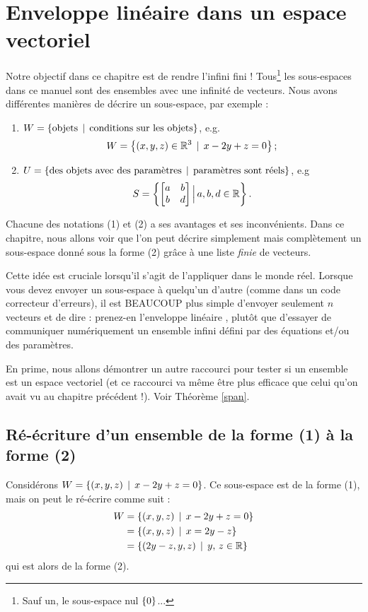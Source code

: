\chapter{Enveloppe linéaire dans un espace vectoriel} \label{chapter:Fr_06-span}


Notre objectif dans ce chapitre est de rendre l'infini fini !  Tous\footnote{Sauf un, le sous-espace nul $\{0\}$...} les sous-espaces dans ce manuel sont des ensembles avec une infinité de vecteurs.  Nous avons différentes manières de décrire un sous-espace, par exemple :
\begin{enumerate}
	\item[(1)] $W = \{ \textrm{objets} \, \mid \, \textrm{conditions sur les objets} \}$,
e.g. $$W = \big\{ (x,y,z) \in \mathbb{R}^3\, \mid \, x -2y+ z=0\big\}\,;$$
	\item[(2)] $U = \{ \textrm{des objets avec des paramètres} \, \mid \, \textrm{paramètres sont réels}\}$,
e.g $$S = \left\{ \left[ \begin{matrix} a & b\\ b & d \end{matrix} \right] \Big| \,a,b,d \in \mathbb{R}\right\}.$$
\end{enumerate}
Chacune des notations (1) et (2) a ses avantages et ses inconvénients. Dans ce chapitre, nous allons voir
que l'on peut décrire simplement mais complètement un sous-espace donné sous la forme (2) grâce à une liste \emph{finie} de vecteurs.

Cette idée est cruciale lorsqu'il s'agit de l'appliquer dans le monde réel. Lorsque vous devez envoyer un sous-espace à quelqu'un d'autre (comme dans un code correcteur d'erreurs), il est BEAUCOUP plus simple d'envoyer seulement $n$ vecteurs et de dire : \og prenez-en l'enveloppe linéaire \fg, plutôt que
d'essayer de communiquer numériquement un ensemble infini défini par
des équations et/ou des paramètres.

En prime, nous allons démontrer un autre raccourci pour tester si
un ensemble est un espace vectoriel (et ce raccourci va même être plus efficace que celui qu'on avait vu au chapitre précédent !). Voir Théorème \ref{span}.

\section{Ré-écriture d'un ensemble de la forme (1) à la forme (2)}

\begin{myexample} Considérons $W = \{ (x,y,z) \, \mid \, x -2y+ z=0\}$. Ce sous-espace est de la forme (1), mais on peut le ré-écrire comme suit :
\begin{align*}
W &= \{ (x,y,z) \, \mid \, x -2y+ z=0\}\\
&= \{ (x,y,z) \, \mid \, x = 2y-z \}\\
&= \{ (2y-z,y,z) \, \mid \, y,\,z \in \mathbb{R}\}
\end{align*}
qui est alors de la forme (2).  
\end{myexample}

